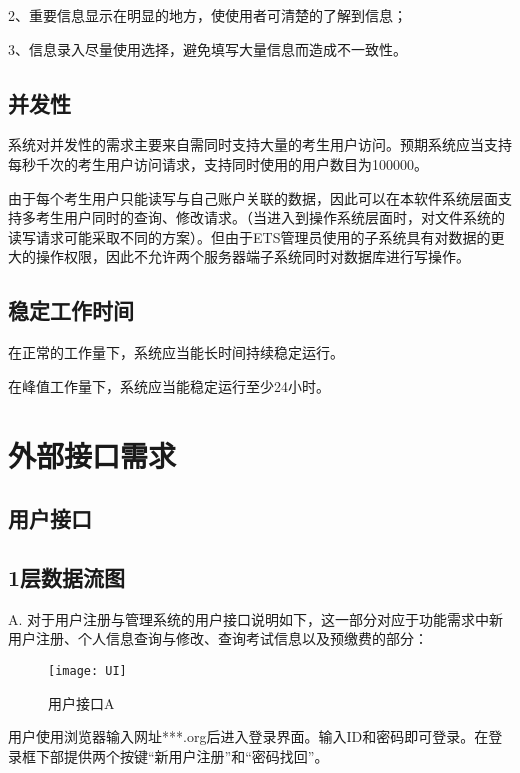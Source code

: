 2、重要信息显示在明显的地方，使使用者可清楚的了解到信息；

3、信息录入尽量使用选择，避免填写大量信息而造成不一致性。

\subsection{并发性}
系统对并发性的需求主要来自需同时支持大量的考生用户访问。预期系统应当支持每秒千次的考生用户访问请求，支持同时使用的用户数目为100000。

由于每个考生用户只能读写与自己账户关联的数据，因此可以在本软件系统层面支持多考生用户同时的查询、修改请求。（当进入到操作系统层面时，对文件系统的读写请求可能采取不同的方案）。但由于ETS管理员使用的子系统具有对数据的更大的操作权限，因此不允许两个服务器端子系统同时对数据库进行写操作。

\subsection{稳定工作时间}
在正常的工作量下，系统应当能长时间持续稳定运行。

在峰值工作量下，系统应当能稳定运行至少24小时。

\section{外部接口需求}

\subsection{用户接口}
\subsection{1层数据流图}

A. 对于用户注册与管理系统的用户接口说明如下，这一部分对应于功能需求中新用户注册、个人信息查询与修改、查询考试信息以及预缴费的部分：

\begin{figure}[ht]
\centering
\texttt{[image: UI]}
\caption{用户接口A}\label{fig:noted-figure}
\end{figure}

用户使用浏览器输入网址***.org后进入登录界面。输入ID和密码即可登录。在登录框下部提供两个按键“新用户注册”和“密码找回”。

